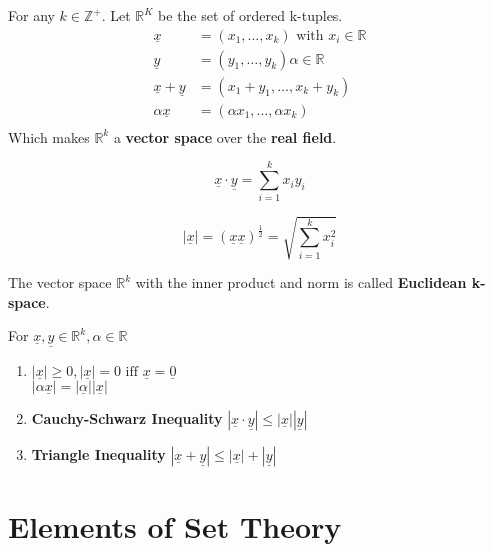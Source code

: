 \documentclass[11pt,fleqn]{book} %
\begin{document}
\begin{definition}
	For any $k \in \mathbb{Z}^+$. Let $\mathbb{R}^K$ be the set of ordered k-tuples. 
	\begin{align*}
	\underline{x} &= (x_1, \dots, x_k) \text{ with }x_i \in \mathbb{R}\\
	\underline{y} &= (y_1, \dots, y_k) \alpha \in \mathbb{R}\\
	\underline{x} + \underline{y} &= (x_1 + y_1, \dots, x_k + y_k)\\
	\alpha\underline{x} &	= (\alpha x_1, \dots, \alpha x_k)\\
	\end{align*}
	Which makes $\mathbb{R}^k$ a \textbf{vector space} over the \textbf{real field}.
\end{definition}

\begin{definition}
$$ \underline{x} \cdot \underline{y} = \sum\limits_{i=1}^k x_i y_i$$	
\end{definition}

\begin{definition}
	$$|\underline{x}| = (\underline{x}\underline{x})^{\frac{1}{2}} = \sqrt{\sum\limits_{i=1}^k x_i^2} $$
\end{definition}

\begin{definition}
	The vector space $\mathbb{R}^k$ with the inner product and norm is called \textbf{Euclidean k-space}.
\end{definition}

\begin{theorem}
	For $\underline{x}, \underline{y} \in \mathbb{R}^k, \alpha \in \mathbb{R}$
	\begin{enumerate}[label = \alph*)]
		\item $|\underline{x}| \ge 0, |\underline{x}| = 0 \text{ iff } \underline{x} = \underline{0}$\\
		$|\alpha \underline{x}| = |\underline{\alpha}||\underline{x}|$ 
		\item \textbf{Cauchy-Schwarz Inequality} $|\underline{x}\cdot\underline{y}| \le |\underline{x}||\underline{y}|$
		\item \textbf{Triangle Inequality} $|\underline{x}+\underline{y}| \le |\underline{x}| + |\underline{y}|$
	\end{enumerate}
\end{theorem}

\section{Elements of Set Theory}
\end{document}

